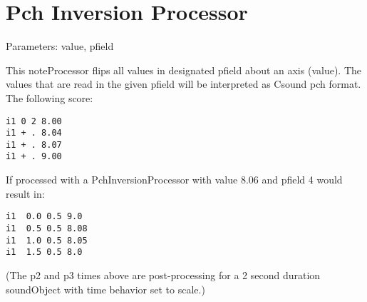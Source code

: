 \section{Pch Inversion Processor}\label{pchInversionProcessor}

Parameters: value, pfield

This noteProcessor flips all values in designated pfield about an axis
(value). The values that are read in the given pfield will be
interpreted as Csound pch format. The following score:

\begin{verbatim}
i1 0 2 8.00
i1 + . 8.04
i1 + . 8.07
i1 + . 9.00
\end{verbatim}

If processed with a PchInversionProcessor with value 8.06 and pfield 4
would result in:

\begin{verbatim}
i1  0.0 0.5 9.0
i1  0.5 0.5 8.08
i1  1.0 0.5 8.05
i1  1.5 0.5 8.0    
\end{verbatim}

(The p2 and p3 times above are post-processing for a 2 second duration
soundObject with time behavior set to scale.)
